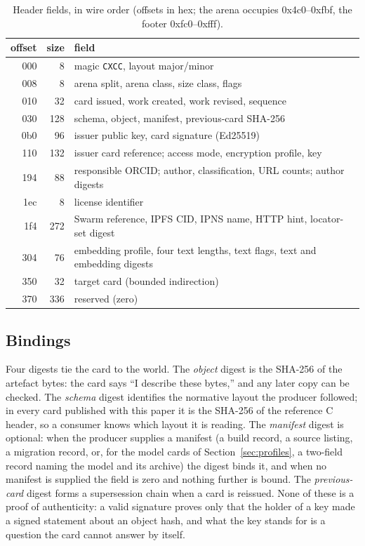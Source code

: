 \documentclass[11pt]{article}
\begin{document}
\begin{table}[t]
\centering
\caption{Header fields, in wire order (offsets in hex; the arena occupies
0x4c0--0xfbf, the footer 0xfc0--0xfff).}
\label{tab:layout}
\small
\begin{tabular}{@{}rrl@{}}
\toprule
offset & size & field \\
\midrule
000 & 8   & magic \texttt{CXCC}, layout major/minor \\
008 & 8   & arena split, arena class, size class, flags \\
010 & 32  & card issued, work created, work revised, sequence \\
030 & 128 & schema, object, manifest, previous-card SHA-256 \\
0b0 & 96  & issuer public key, card signature (Ed25519) \\
110 & 132 & issuer card reference; access mode, encryption profile, key \\
194 & 88  & responsible ORCID; author, classification, URL counts; author digests \\
1ec & 8   & license identifier \\
1f4 & 272 & Swarm reference, IPFS CID, IPNS name, HTTP hint, locator-set digest \\
304 & 76  & embedding profile, four text lengths, text flags, text and embedding digests \\
350 & 32  & target card (bounded indirection) \\
370 & 336 & reserved (zero) \\
\bottomrule
\end{tabular}
\end{table}

\subsection{Bindings}
\label{sec:bindings}

Four digests tie the card to the world. The \emph{object} digest is the SHA-256
of the artefact bytes: the card says ``I describe these bytes,'' and any later
copy can be checked. The \emph{schema} digest identifies the normative layout
the producer followed; in every card published with this paper it is the
SHA-256 of the reference C header, so a consumer knows which layout it is
reading. The \emph{manifest} digest is optional: when the producer supplies a
manifest (a build record, a source listing, a migration record, or, for the
model cards of Section~\ref{sec:profiles}, a two-field record naming the
model and its archive) the digest binds it, and when no manifest is supplied
the field is zero and nothing further is bound. The \emph{previous-card}
digest forms a supersession chain when a card is reissued. None of these is a
proof of authenticity: a valid signature proves only that the holder of a key
made a signed statement about an object hash, and what the key stands for is
a question the card cannot answer by itself.
\end{document}
